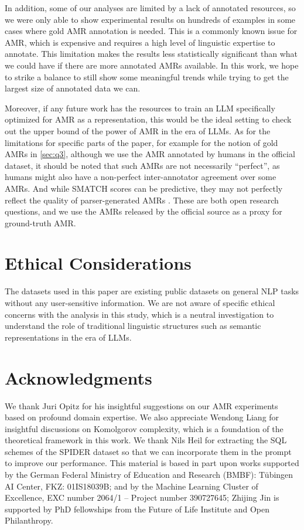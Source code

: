 \begin{enumerate}
In addition, some of our analyses are limited by a lack of annotated resources, so we were only able to show experimental results on hundreds of examples in some cases where gold AMR annotation is needed. This is a commonly known issue for AMR, which is expensive and requires a high level of linguistic expertise to annotate. This limitation makes the results less statistically significant than what we could have if there are more annotated AMRs available.
In this work, we hope to strike a balance to still show some meaningful trends while trying to get the largest size of annotated data we can.

Moreover, if any future work has the resources to train an LLM specifically optimized for AMR as a representation, this would be the ideal setting to check out the upper bound of the power of AMR in the era of LLMs.
As for the limitations for specific parts of the paper, for example for the notion of gold AMRs in \cref{sec:q3}, although we use the AMR annotated by humans in the official \citet{banarescu2013abstract} dataset, it should be noted that such AMRs are not necessarily ``perfect'', as humans might also have a non-perfect inter-annotator agreement over some AMRs. And while SMATCH scores can be predictive, they may not perfectly reflect the quality of parser-generated AMRs \cite{opitz-frank-2022-better}. These are both open research questions, and we use the AMRs released by the official source \cite{banarescu2013abstract} as a proxy for ground-truth AMR.

\section*{Ethical Considerations}
The datasets used in this paper are existing public datasets on general NLP tasks without any user-sensitive information. We are not aware of specific ethical concerns with the analysis in this study, which is a neutral investigation to understand the role of traditional linguistic structures such as semantic representations in the era of LLMs.

\ifarxiv

\section*{Acknowledgments}

We thank Juri Opitz for his insightful suggestions on our AMR experiments based on profound domain expertise.
We also appreciate Wendong Liang for insightful discussions on Komolgorov complexity, which is a foundation of the theoretical framework in this work.
We thank Nils Heil for extracting the SQL schemes of the SPIDER dataset so that we can incorporate them in the prompt to improve our performance. 
This material is based in part upon works supported by the German Federal Ministry of Education and Research (BMBF): Tübingen AI Center, FKZ: 01IS18039B; and by the Machine Learning Cluster of Excellence, EXC number 2064/1 – Project number 390727645;
Zhijing Jin is supported by PhD fellowships from the Future of Life Institute and Open Philanthropy.

\end{enumerate}
